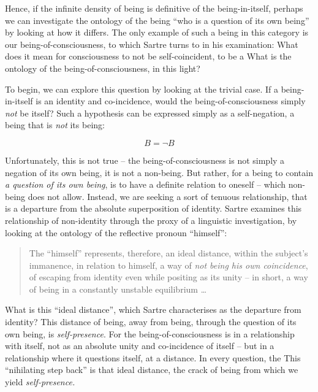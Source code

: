 Hence, if the infinite density of being is definitive of the being-in-itself, perhaps we can investigate the ontology of the being \enquote{who is a question of its own being} by looking at how it differs. The only example of such a being in this category is our being-of-consciousness, to which Sartre turns to in his examination:  What does it mean for consciousness to not be self-coincident, to be a  What is the ontology of the being-of-consciousness, in this light?

To begin, we can explore this question by looking at the trivial case. If a being-in-itself is an identity and co-incidence, would the being-of-consciousness simply \emph{not} be itself? Such a hypothesis can be expressed simply as a self-negation, a being that is \emph{not} its being:

\begin{equation}
    B = \neg B
\end{equation}

\noindent
Unfortunately, this is not true -- the being-of-consciousness is not simply a negation of its own being, it is not a non-being. But rather, for a being to contain \emph{a question of its own being}, is to have a definite relation to oneself -- which non-being does not allow. Instead, we are seeking a sort of tenuous relationship, that is a departure from the absolute superposition of identity. Sartre examines this relationship of non-identity through the proxy of a linguistic investigation, by looking at the ontology of the reflective pronoun \enquote{himself}:

\blockcquote[126]{Sartre}{%
    The \enquote{himself} represents, therefore, an ideal distance, within the subject's immanence, in relation to himself, a way of \emph{not being his own coincidence}, of escaping from identity even while positing as its unity -- in short, a way of being in a constantly unstable equilibrium \ldots\
}

\noindent
What is this \enquote{ideal distance}, which Sartre characterises as the departure from identity? This distance of being, away from being, through the question of its own being, is \emph{self-presence}. For the being-of-consciousness is in a relationship with itself, not as an absolute unity and co-incidence of itself -- but in a relationship where it questions itself, at a distance. In every question, the  This \enquote{nihilating step back} is that ideal distance, the crack of being from which we yield \emph{self-presence.}

